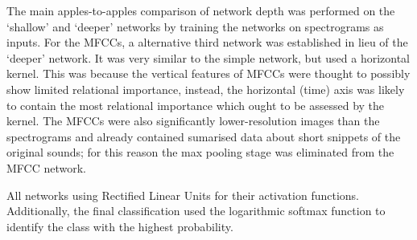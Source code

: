 \documentclass[class=report,11pt,crop=false]{standalone}
\begin{document}
The main apples-to-apples comparison of network depth was performed on the `shallow' and `deeper' networks by training the networks on spectrograms as inputs. For the MFCCs, a alternative third network was established in lieu of the `deeper' network. It was very similar to the simple network, but used a horizontal kernel. This was because the vertical features of MFCCs were thought to possibly show limited relational importance, instead, the horizontal (time) axis was likely to contain the most relational importance which ought to be assessed by the kernel. The MFCCs were also significantly lower-resolution images than the spectrograms and already contained sumarised data about short snippets of the original sounds; for this reason the max pooling stage was eliminated from the MFCC network.

All networks using Rectified Linear Units for their activation functions. Additionally, the final classification used the logarithmic softmax function to identify the class with the highest probability.




\ifstandalone

\printnoidxglossary[type=\acronymtype,nonumberlist]
\fi
\end{document}
